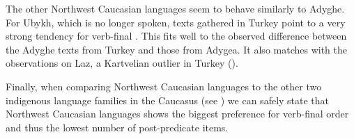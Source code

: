 \documentclass[output=paper,colorlinks,citecolor=brown, draft]{langscibook}
\begin{document}
The other Northwest Caucasian languages seem to behave similarly to Adyghe. For Ubykh, which is no longer spoken, texts gathered in Turkey point to a very strong tendency for verb-final . This fits well to the observed difference between the Adyghe texts from Turkey and those from Adygea. It also matches with the observations on Laz, a Kartvelian outlier in Turkey ().

Finally, when comparing Northwest Caucasian languages to the other two indigenous language families in the Caucasus (see ) we can safely state that Northwest Caucasian languages shows the biggest preference for verb-final order and thus the lowest number of post-predicate items.
\end{document}
